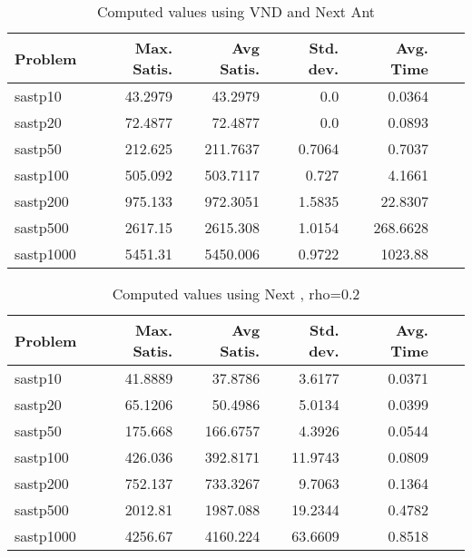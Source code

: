 \documentclass{article}
\begin{document}
\begin{table}[b!]
  \vspace{-6mm}%
  \caption{Computed values using VND and Next Ant}
  \label{tab:conf2}
  \setlength{\tabcolsep}{1.4mm}
  \centering
  \begin{tabular}{lrrrrrr}
    \bfseries Problem &
    \bfseries Max. Satis. &
    \bfseries Avg Satis. &
    \bfseries Std. dev. &
    \bfseries Avg. Time 
    \\\hline
   sastp10 & 43.2979 & 43.2979 & 0.0 & 0.0364 \\ 
sastp20 & 72.4877 & 72.4877 & 0.0 & 0.0893 \\ 
sastp50 & 212.625 & 211.7637 & 0.7064 & 0.7037 \\ 
sastp100 & 505.092 & 503.7117 & 0.727 & 4.1661 \\ 
sastp200 & 975.133 & 972.3051 & 1.5835 & 22.8307 \\ 
sastp500 & 2617.15 & 2615.308 & 1.0154 & 268.6628 \\ 
sastp1000 & 5451.31 & 5450.006 & 0.9722 & 1023.88
    \\\hline
  \end{tabular}

\end{table}


\begin{table}[b!]
  \vspace{-6mm}%
  \caption{Computed values using Next , rho=0.2}
  \label{tab:conf3}
  \setlength{\tabcolsep}{1.4mm}
  \centering
  \begin{tabular}{lrrrrrr}
    \bfseries Problem &
    \bfseries Max. Satis. &
    \bfseries Avg Satis. &
    \bfseries Std. dev. &
    \bfseries Avg. Time 
    \\\hline
    sastp10 & 41.8889 & 37.8786 & 3.6177 & 0.0371 \\ 
    sastp20 & 65.1206 & 50.4986 & 5.0134 & 0.0399 \\ 
    sastp50 & 175.668 & 166.6757 & 4.3926 & 0.0544 \\ 
    sastp100 & 426.036 & 392.8171 & 11.9743 & 0.0809 \\ 
    sastp200 & 752.137 & 733.3267 & 9.7063 & 0.1364 \\ 
    sastp500 & 2012.81 & 1987.088 & 19.2344 & 0.4782 \\ 
    sastp1000 & 4256.67 & 4160.224 & 63.6609 & 0.8518

    \\\hline
  \end{tabular}

\end{table}
\end{document}
